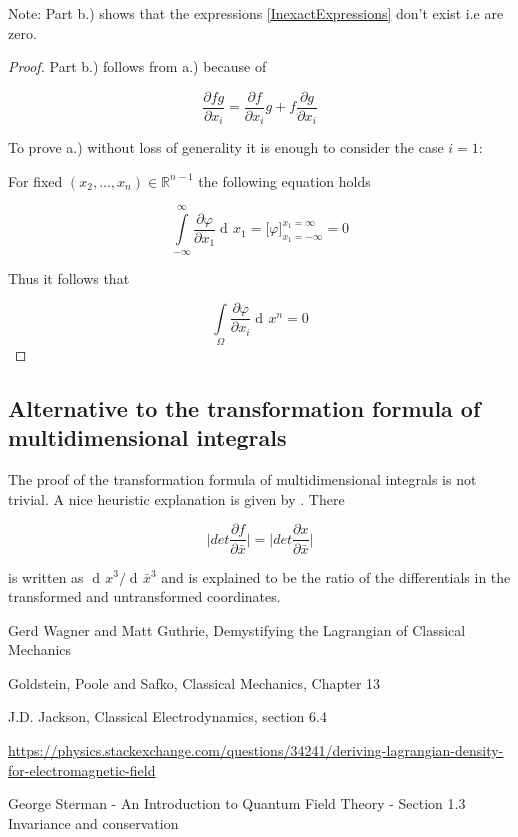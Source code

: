 \documentclass{article}
\DeclareMathOperator{\dd}{d\!}
\begin{document}
Note: Part b.) shows that the expressions \ref{InexactExpressions} don't exist i.e are zero.
\\

\begin{proof}
Part b.) follows from a.) because of 


\begin{equation}
\frac{\partial fg}{\partial x_i} = \frac{\partial f}{\partial x_i} g + f \frac{\partial g}{\partial x_i}
\end{equation}

To prove a.) without loss of generality it is enough to consider the case $i=1$:

For fixed $(x_2,...,x_n) \in \mathbb{R}^{n-1}$ the following equation holds

\begin{equation}
\int\limits_{-\infty}^{\infty} \frac{\partial \varphi}{\partial x_1} \dd x_1 = \big[\varphi\big]_{x_1 = -\infty}^{x_1 =  \infty} = 0
\end{equation}

Thus it follows that 

\begin{equation}
\int\limits_{\Omega} \frac{\partial \varphi}{\partial x_i} \dd x^n = 0
\end{equation}

\end{proof}


\subsection{Alternative to the transformation formula of multidimensional integrals} \label{TranformationFormula}

The proof of the transformation formula of multidimensional integrals is not trivial. 
A nice heuristic explanation is given by \cite{Sterman}. There

\begin{equation}
\bigg|det \frac{\partial f}{\partial \bar{x}} \bigg| =  \bigg|det \frac{\partial x}{\partial \bar{x}} \bigg|
\end{equation}

is written as $\dd x^3 / \dd \bar{x}^3$ and is explained to be the ratio of the differentials in the transformed and untransformed coordinates.


\begin{thebibliography}{9}

 Gerd Wagner and Matt Guthrie, Demystifying the Lagrangian of Classical Mechanics

 Goldstein, Poole and Safko, Classical Mechanics, Chapter 13 

 J.D. Jackson, Classical Electrodynamics, section 6.4

 \url{https://physics.stackexchange.com/questions/34241/deriving-lagrangian-density-for-electromagnetic-field}

 George Sterman - An Introduction to Quantum Field Theory - Section 1.3 Invariance and conservation


\end{thebibliography}
\end{document}
